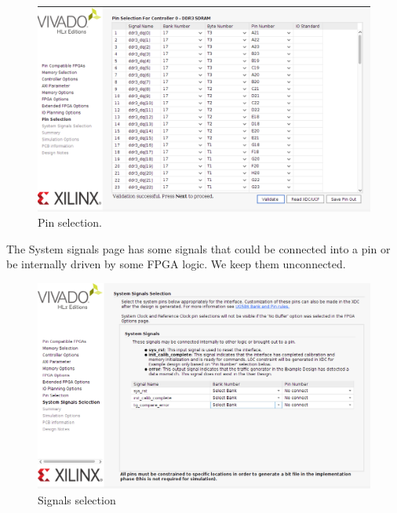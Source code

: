\begin{figure}
    \centering
    \includegraphics[scale=0.3]{img/mig_3.png}
    \caption{Pin selection.}
    \label{fig:mig3}
\end{figure}

The System signals page has some signals that could be connected into a pin or be internally driven by some FPGA logic.
We keep them unconnected.


\begin{figure}
    \centering
    \includegraphics[scale=0.3]{img/mig_4.png}
    \caption{Signals selection}
    \label{fig:mig_4}
\end{figure}


